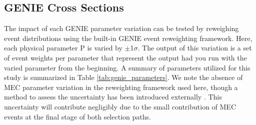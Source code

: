 \documentclass{article}
\begin{document}




\subsection{GENIE Cross Sections}
The impact of each GENIE parameter variation can be tested by reweighing event distributions using the built-in GENIE event reweighting framework. Here, each physical parameter P is varied by $\pm$1$\sigma$. The output of this variation is a set of event weights per parameter that represent the output had you run with the varied parameter from the beginning. A summary of parameters utilized for this study is summarized in Table \ref{tab:genie_parameters}. We note the absence of MEC parameter variation in the reweighting framework used here, though a method to assess the uncertainty has been introduced externally \cite{bib:jaz_datamc_agreement}.  This uncertainty will contribute negligibly due to the small contribution of MEC events at the final stage of both selection paths.
\end{document}
